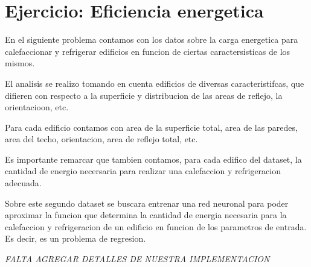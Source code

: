 \section{Ejercicio: Eficiencia energetica}

En el siguiente problema contamos con los datos sobre la carga energetica para calefaccionar y refrigerar edificios en funcion de ciertas caractersisticas de los mismos.

El analisis se realizo tomando en cuenta edificios de diversas caracteristifcas, que difieren con respecto a la superficie y distribucion de las areas de reflejo, la orientacioon, etc.

Para cada edificio contamos con area de la superficie total, area de las paredes, area del techo, orientacion, area de reflejo total, etc.

Es importante remarcar que tambien contamos, para cada edifico del dataset, la cantidad de energio necersaria para realizar una calefaccion y refrigeracion adecuada.

Sobre este segundo dataset se buscara entrenar una red neuronal para poder aproximar la funcion que determina la cantidad de energia necesaria para
la calefaccion y refrigeracion de un edificio en funcion de los parametros de entrada. Es decir, es un problema de regresion.

\emph{\color{red} FALTA AGREGAR DETALLES DE NUESTRA IMPLEMENTACION}